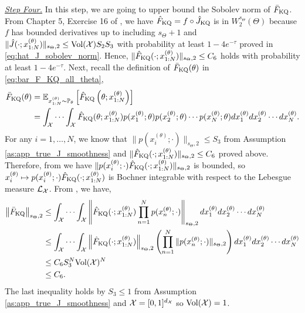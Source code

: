 \underline{\emph{Step Four.}} 
In this step, we are going to upper bound the Sobolev norm of $\bar{F}_{\text{KQ}}$.
From Chapter 5, Exercise 16 of \cite{evans2022partial}, we have 
$\hat{F}_{\text{KQ}} = f \circ \hat{J}_{\text{KQ}} $ is in $W_2^{s_\Theta} (\Theta)$ because $f$ has bounded derivatives up to including $s_\Theta+1$ and $\|\hat{J}(\cdot; x_{1:N}^{(\theta)})\|_{s_\Theta, 2} \leq \text{Vol}(\mathcal{X})  S_2 S_3$ with probability at least $1- 4e^{-\tau}$ proved in \eqref{eq:hat_J_sobolev_norm}. 
Hence, $\|\hat{F}_{\text{KQ}}(\cdot; x_{1:N}^{(\theta)})\|_{s_\Theta, 2} \leq C_6$ holds with probability at least $1- 4e^{-\tau}$.
Next, recall the definition of $\bar{F}_{\text{KQ}}(\theta)$ in \eqref{eq:bar_F_KQ_all_theta},
\begin{align*}
    \bar{F}_{\text{KQ}}(\theta) &= \mathbb{E}_{x_{1: N}^{(\theta)} \sim \mathbb{P}_\theta}\left[\hat{F}_{\mathrm{KQ}}\left(\theta ; x_{1: N}^{(\theta)}\right)\right] \\
    &= \int_{\mathcal{X}} \cdots \int_{\mathcal{X}}  \hat{F}_{\text{KQ}}(\theta; x_{1:N}^{(\theta)}) p(x_1^{(\theta)}; \theta) p(x_2^{(\theta)}; \theta) \cdots p(x_N^{(\theta)}; \theta) d x_1^{(\theta)} d x_2^{(\theta)} \cdots d x_N^{(\theta)} .
\end{align*}
For any $i = 1, \ldots, N$, we know that $\| p(x_i^{(\theta)}; \cdot) \|_{s_\Theta, 2} \leq S_3$ from Assumption \ref{as:app_true_J_smoothness} and $\| \hat{F}_{\text{KQ}}(\cdot; x_{1:N}^{(\theta)}) \|_{s_\Theta, 2} \leq C_6$ proved above.
Therefore, from  we have $\| p(x_i^{(\theta)}; \cdot) \hat{F}_{\text{KQ}}(\cdot; x_{1:N}^{(\theta)})\|_{s_\Theta, 2}$ is bounded, so $x_i^{(\theta)} \mapsto p(x_i^{(\theta)}; \cdot) \hat{F}_{\text{KQ}}(\cdot; x_{1:N}^{(\theta)})$ is Bochner integrable with respect to the Lebesgue measure $\mathcal{L}_{\mathcal{X}}$. 
From , we have,
\begin{align}\label{eq:bar_F_norm}
    \left\| \bar{F}_{\text{KQ}} \right\|_{s_\Theta, 2}
    &\leq \int_{\mathcal{X}} \cdots \int_{\mathcal{X}} \left\| \hat{F}_{\text{KQ}}(\cdot; x_{1:N}^{(\theta)}) \prod_{n=1}^N p(x_n^{(\theta)}; \cdot)  \right\|_{s_\Theta, 2} d x_1^{(\theta)} d x_2^{(\theta)} \cdots d x_N^{(\theta)}  \nonumber \\
    & \leq \int_{\mathcal{X}} \cdots \int_{\mathcal{X}} \left\| \hat{F}_{\text{KQ}}(\cdot; x_{1:N}^{(\theta)}) \right\|_{s_\Theta, 2} \left( \prod_{n=1}^N \| p(x_n^{(\theta)}; \cdot) \|_{s_\Theta, 2} \right) d x_1^{(\theta)} d x_2^{(\theta)} \cdots d x_N^{(\theta)} \nonumber \\
    &\leq C_6 S_3^N \text{Vol}(\mathcal{X})^N \nonumber \\
    &\leq C_6 .
\end{align}
The last inequality holds by $S_3\leq1$ from Assumption \ref{as:app_true_J_smoothness} and $\mathcal{X}=[0,1]^{d_{\mathcal{X}}}$ so $\text{Vol}(\mathcal{X})=1$.

